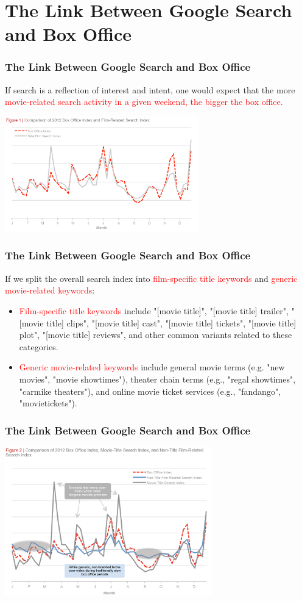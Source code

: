 \documentclass[slidestop,compress,red,mathserif]{beamer}
\begin{document}
\section{The Link Between Google Search and Box Office}
\begin{frame}
\frametitle{The Link Between Google Search and Box Office}
If search is a reflection of interest and intent, one would expect that the more \textcolor{red}{movie-related search activity in a given weekend, 
the bigger the box office.}
\begin{center}
\includegraphics[height=5cm]{fig1.png}
\end{center}
\end{frame}
\begin{frame}
\frametitle{The Link Between Google Search and Box Office}
If we split the overall search index into \textcolor{red}{film-specific title keywords} and \textcolor{red}{generic movie-related keywords}:
\begin{itemize}  \footnotesize
	\pause \item \textcolor{red}{Film-specific title keywords} include "[movie title]", "[movie title] trailer", "[movie title] clips", "[movie title] cast", "[movie title] tickets", "[movie title] plot", "[movie title] reviews", and other common variants related to these categories.
	\pause \item \textcolor{red}{Generic movie-related keywords} include general movie terms (e.g. "new movies", "movie showtimes"), theater chain terms (e.g., "regal showtimes", "carmike theaters"), and online movie ticket services (e.g., "fandango", "movietickets").
\end{itemize}
\end{frame}

\begin{frame}
\frametitle{The Link Between Google Search and Box Office}
\begin{center}
\includegraphics[width=9cm]{fig2.png}
\end{center}
\end{frame}
\end{document}
